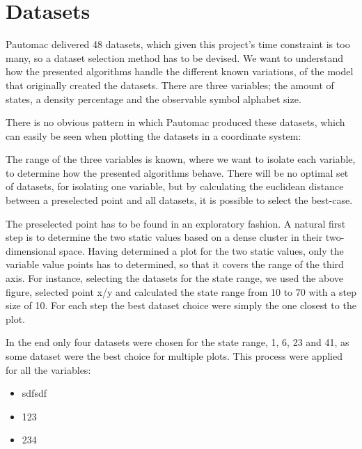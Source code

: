 \section{Datasets}
Pautomac delivered 48 datasets, which given this project's time constraint is too many, so a dataset selection method has to be devised. We want to understand how the presented algorithms handle the different known variations, of the model that originally created the datasets. There are three variables; the amount of states, a density percentage and the observable symbol alphabet size.

There is no obvious pattern in which Pautomac produced these datasets, which can easily be seen when plotting the datasets in a coordinate system:


The range of the three variables is known, where we want to isolate each variable, to determine how the presented algorithms behave. There will be no optimal set of datasets, for isolating one variable, but by calculating the euclidean distance between a preselected point and all datasets, it is possible to select the best-case.

The preselected point has to be found in an exploratory fashion. A natural first step is to determine the two static values based on a dense cluster in their two-dimensional space. Having determined a plot for the two static values, only the variable value points has to determined, so that it covers the range of the third axis. For instance, selecting the datasets for the state range, we used the above figure, selected point x/y and calculated the state range from 10 to 70 with a step size of 10. For each step the best dataset choice were simply the one closest to the plot.

In the end only four datasets were chosen for the state range, 1, 6, 23 and 41, as some dataset were the best choice for multiple plots. This process were applied for all the variables:

\begin{itemize}
\item sdfsdf
\end{itemize}

\begin{itemize}
\item 123
\end{itemize}

\begin{itemize}
\item 234
\end{itemize}




